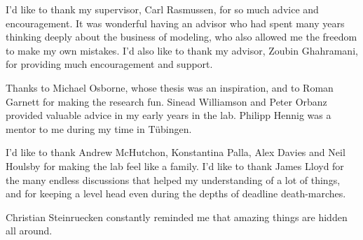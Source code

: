 
\begin{acknowledgements}      


I'd like to thank my supervisor, Carl Rasmussen, for so much advice and encouragement.
It was wonderful having an advisor who had spent many years thinking deeply about the business of modeling,
 who also allowed me the freedom to make my own mistakes.
I'd also like to thank my advisor, Zoubin Ghahramani, for providing much encouragement and support.

Thanks to Michael Osborne, whose thesis was an inspiration, and to Roman Garnett for making the research fun.
Sinead Williamson and Peter Orbanz provided valuable advice in my early years in the lab.
Philipp Hennig was a mentor to me during my time in T\"{u}bingen.

I'd like to thank Andrew McHutchon, Konstantina Palla, Alex Davies and Neil Houlsby for making the lab feel like a family.
I'd like to thank James Lloyd for the many endless discussions that helped my understanding of a lot of things, and for keeping a level head even during the depths of deadline death-marches.

Christian Steinruecken constantly reminded me that amazing things are hidden all around.

\end{acknowledgements}
